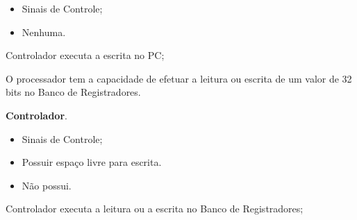 \documentclass{article}
\begin{document}
  \preconditions 
    \begin{itemize}
     \item Sinais de Controle;
    \end{itemize}

  \postconditions
    \begin{itemize}
     \item Nenhuma.
    \end{itemize}

  
  \begin{mainflow}
    \item Controlador executa a escrita no PC;
  \end{mainflow}  

   O processador tem a capacidade de efetuar a leitura ou escrita de um valor de 32 bits no Banco de Registradores.
  
  \actors
    \begin{description}
     \item \textbf{Controlador}.
    \end{description}
    
  \preconditions 
    \begin{itemize}
     \item Sinais de Controle;
     \item Possuir espaço livre para escrita.
    \end{itemize}

  \postconditions
    \begin{itemize}
    \item Não possui.
    \end{itemize}

  
  \begin{mainflow}
    \item Controlador executa a leitura ou a escrita no Banco de Registradores;
  \end{mainflow}  


 

% 
% 
\end{document}
